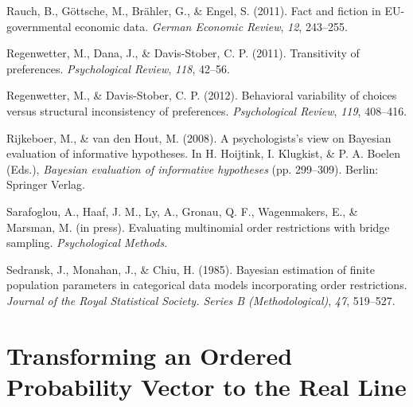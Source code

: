 \documentclass[
  english,
  man,floatsintext]{apa6}
\begin{document}
\leavevmode\hypertarget{ref-rauch2011fact}{}%
Rauch, B., Göttsche, M., Brähler, G., \& Engel, S. (2011). Fact and fiction in EU-governmental economic data. \emph{German Economic Review}, \emph{12}, 243--255.

\leavevmode\hypertarget{ref-regenwetter2011transitivity}{}%
Regenwetter, M., Dana, J., \& Davis-Stober, C. P. (2011). Transitivity of preferences. \emph{Psychological Review}, \emph{118}, 42--56.

\leavevmode\hypertarget{ref-regenwetter2012behavioral}{}%
Regenwetter, M., \& Davis-Stober, C. P. (2012). Behavioral variability of choices versus structural inconsistency of preferences. \emph{Psychological Review}, \emph{119}, 408--416.

\leavevmode\hypertarget{ref-rijkeboer2008psychologists}{}%
Rijkeboer, M., \& van den Hout, M. (2008). A psychologists's view on Bayesian evaluation of informative hypotheses. In H. Hoijtink, I. Klugkist, \& P. A. Boelen (Eds.), \emph{Bayesian evaluation of informative hypotheses} (pp. 299--309). Berlin: Springer Verlag.

\leavevmode\hypertarget{ref-sarafoglou2020evaluatingPreprint}{}%
Sarafoglou, A., Haaf, J. M., Ly, A., Gronau, Q. F., Wagenmakers, E., \& Marsman, M. (in press). Evaluating multinomial order restrictions with bridge sampling. \emph{Psychological Methods}.

\leavevmode\hypertarget{ref-sedransk1985bayesian}{}%
Sedransk, J., Monahan, J., \& Chiu, H. (1985). Bayesian estimation of finite population parameters in categorical data models incorporating order restrictions. \emph{Journal of the Royal Statistical Society. Series B (Methodological)}, \emph{47}, 519--527.

\endgroup

\clearpage

\setcounter{table}{0}
\setcounter{figure}{0}
\setcounter{equation}{0}
\setcounter{section}{0}
\renewcommand\thefigure{0\arabic{figure}}
\renewcommand{\thetable}{0\arabic{table}}
\renewcommand{\theequation}{C\arabic{equation}}
\renewcommand{\thesection}{\Alph{section}}

\hypertarget{transforming-an-ordered-probability-vector-to-the-real-line}{%
\section{Transforming an Ordered Probability Vector to the Real Line}\label{transforming-an-ordered-probability-vector-to-the-real-line}}
\end{document}
